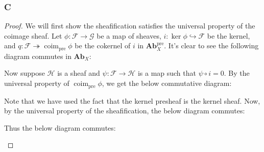 \documentclass{article}
\newcommand{\fF}{\mathscr{F}}
\newcommand{\fG}{\mathscr{G}}
\newcommand{\fH}{\mathscr{H}}
\DeclareMathOperator{\pre}{pre}
\DeclareMathOperator{\coim}{coim}
\DeclareMathOperator{\sh}{sh}
\newcommand{\Ab}{\mathbf{Ab}} %
\begin{document}
\subsubsection{C}\label{2.6.C}
\begin{proof}
    We will first show the sheafification satisfies the universal property of the coimage sheaf. Let $\phi:\fF\to \fG$ be a map of sheaves, $i:\ker \phi \hookrightarrow \fF$ be the kernel, and $q:\fF\twoheadrightarrow \coim_{\pre} \phi$ be the cokernel of $i$ in $\Ab_X^{\pre}$. It's clear to see the following diagram commutes in $\Ab_X$:
    \begin{center}
    \end{center}
    Now suppose $\fH$ is a sheaf and $\psi:\fF\to \fH$ is a map such that $\psi \circ i=0$. By the universal property of $\coim_{\pre} \phi$, we get the below commutative diagram:
    \begin{center}
    \end{center}
    Note that we have used the fact that the kernel presheaf is the kernel sheaf. Now, by the universal property of the sheafification, the below diagram commutes:
    \begin{center}
    \end{center}
    Thus the below diagram commutes:
    \begin{center}
\end{center}
\end{proof}
\end{document}
